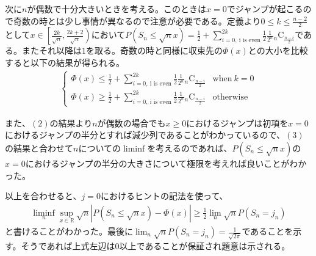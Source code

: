\documentclass{article}
\begin{document}
次に$n$が偶数で十分大きいときを考える。このときは$x=0$でジャンプが起こるので奇数の時とは少し事情が異なるので注意が必要である。定義より$0\leq k\leq \frac{n-2}{2}$として$x\in \left[ \frac{2k}{\sqrt{n}}, \frac{2k+2}{\sqrt{n}} \right)$において$P\left( S_n \leq \sqrt{n} x \right) = \frac{1}{2} + \sum_{i=0,\ \text{i is even}}^{2k} \frac{1}{2} \frac{1}{2^n} {}_n \mathrm{C} _\frac{n-i}{2}$である。またそれ以降は$1$を取る。奇数の時と同様に収束先の$\Phi(x)$との大小を比較すると以下の結果が得られる。
\begin{align}
	\begin{cases}
	\Phi(x) \leq \frac{1}{2} + \sum_{i=0,\ \text{i is even}}^{2k} \frac{1}{2} \frac{1}{2^n} {}_n \mathrm{C} _\frac{n-i}{2} & \text{when}\ k=0\\[8pt]
	\Phi(x) \geq \frac{1}{2} + \sum_{i=0,\ \text{i is even}}^{2k} \frac{1}{2} \frac{1}{2^n} {}_n \mathrm{C} _\frac{n-i}{2} & \text{otherwise}
	\end{cases}
\end{align}

また、$(2)$の結果より$n$が偶数の場合でも$x\geq0$におけるジャンプは初項を$x=0$におけるジャンプの半分とすれば減少列であることがわかっているので、$(3)$の結果と合わせて$n$についての$\liminf$を考えるのであれば、$P\left( S_n \leq \sqrt{n} x \right)$の$x=0$におけるジャンプの半分の大きさについて極限を考えれば良いことがわかった。

以上を合わせると、$j=0$におけるヒントの記法を使って、
\begin{align*}
	\liminf_n \sup_{x\in \mathbb{R}} \sqrt{n} \left| P\left( S_n \leq \sqrt{n} x \right) - \Phi(x) \right| \geq \frac{1}{2} \lim_n \sqrt{n} P\left( S_n = j_n \right)
\end{align*}
と書けることがわかった。最後に$\lim_n \sqrt{n} P\left( S_n = j_n \right) = \frac{1}{\sqrt{2\pi}}$であることを示す。そうであれば上式左辺は$0$以上であることが保証され題意は示される。
\end{document}
